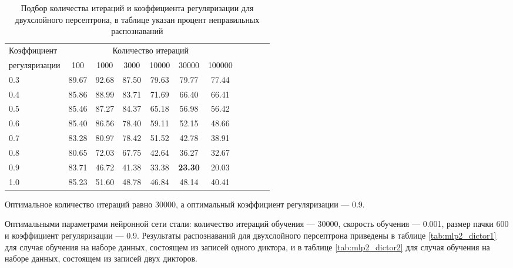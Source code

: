 \begin{table}[h]
	\centering
	\caption{Подбор количества итераций и коэффициента регуляризации для двухслойного персептрона, в таблице указан процент неправильных распознаваний}
	\label{tab:mlp2_bf_iter_reg}
	\begin{tabular}{| l | c | c | c | c | c | c | c | c | c | c |}
		\hline
		Коэффициент	  & \multicolumn{6}{c|}{Количество итераций} \\
		\hhline{~----------}
		регуляризации & \phantom{0} 100 \phantom{0} & \phantom{0} 1000 \phantom{0} & \phantom{0} 3000 \phantom{0} & \phantom{0} 10000 \phantom{0} & \phantom{0} 30000 \phantom{0} & \phantom{0} 100000 \phantom{0} \\
		\hline
		0.3			  & 89.67 & 92.68 & 87.50 & 79.63 & 79.77 & 77.44 \\
		0.4			  & 85.86 & 88.99 & 83.71 & 71.69 & 66.40 & 66.41 \\
		0.5			  & 85.46 & 87.27 & 84.37 & 65.18 & 56.98 & 56.42 \\
		0.6			  & 85.40 & 86.56 & 78.40 & 59.11 & 52.15 & 48.66 \\
		0.7			  & 83.28 & 80.97 & 78.42 & 51.52 & 42.78 & 38.91 \\
		0.8			  & 80.65 & 72.03 & 67.75 & 42.64 & 36.27 & 32.67 \\
		0.9			  & 83.71 & 46.72 & 41.38 & 33.38 & \textbf{23.30} & 20.03 \\
		1.0			  & 85.23 & 51.60 & 48.78 & 46.84 & 48.14 & 40.41 \\
		\hline
	\end{tabular}
\end{table}

Оптимальное количество итераций равно 30000, а оптимальный коэффициент регуляризации --- 0.9.

Оптимальными параметрами нейронной сети стали: количество итераций обучения --- 30000, скорость обучения --- 0.001, размер пачки 600 и коэффициент регуляризации --- 0.9.
Результаты распознаваний для двухслойного персептрона приведены в таблице \ref{tab:mlp2_dictor1} для случая обучения на наборе данных, состоящем из записей одного диктора, и в таблице \ref{tab:mlp2_dictor2} для случая обучения на наборе данных, состоящем из записей двух дикторов.

